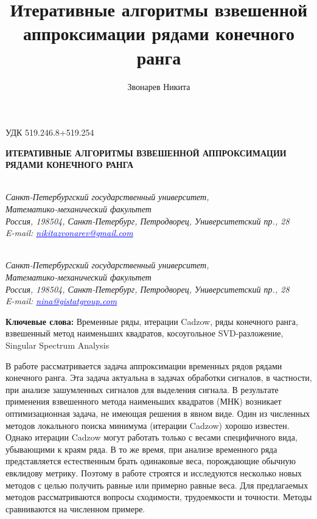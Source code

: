\documentclass[12pt,a4paper,fleqn,leqno]{article}
\author{Звонарев Никита}
\title{Итеративные алгоритмы взвешенной аппроксимации рядами конечного ранга}
\begin{document}
\noindent УДК 519.246.8+519.254

\begin{center}{
\fontsize{18pt}{23pt}\selectfont\bf%
  \MakeUppercase{
 Итеративные алгоритмы взвешенной аппроксимации рядами конечного ранга
}}
\end{center}

\begin{center}{\bpv{}\\
\footnotesize\it Санкт-Петербургский государственный университет,\\
Математико-механический факультет
\\
\rm
Россия, 198504, Санкт-Петербург, Петродворец, Университетский пр., 28\\
E-mail: \textcolor {blue}{\underline{nikitazvonarev@gmail.com}}}
\end{center}
\begin{center}{\\
\footnotesize\it Санкт-Петербургский государственный университет,\\
Математико-механический факультет
\\
\rm
Россия, 198504, Санкт-Петербург, Петродворец, Университетский пр., 28\\
E-mail: \textcolor {blue}{\underline{nina@gistatgroup.com}}}
\end{center}
\hspace{1.25cm}\begin{minipage}{12.16cm}\bpv\bpv\bmv \noindent
\footnotesize{\bf Ключевые слова:}\/ Временные ряды, итерации Cadzow, ряды конечного ранга, взвешенный метод наименьших квадратов, косоугольное SVD-разложение, Singular Spectrum Analysis

\bpv\bpv\noindent  В работе рассматривается задача аппроксимации временных рядов рядами конечного ранга. Эта задача актуальна в задачах обработки сигналов, в частности, при анализе зашумленных сигналов для выделения сигнала. В результате применения взвешенного метода наименьших квадратов (МНК) возникает оптимизационная задача, не имеющая решения в явном виде. Один из численных методов локального поиска минимума (итерации Cadzow) хорошо известен. Однако  итерации Cadzow могут работать только с весами специфичного вида, убывающими к краям ряда. В то же время, при анализе временного ряда представляется естественным брать одинаковые веса, порождающие обычную евклидову метрику. Поэтому в работе строятся и исследуются несколько новых методов с целью получить равные или примерно равные веса. Для предлагаемых методов рассматриваются вопросы сходимости, трудоемкости и точности. Методы сравниваются на численном примере.

\end{minipage}\bls\bmv
\end{document}
